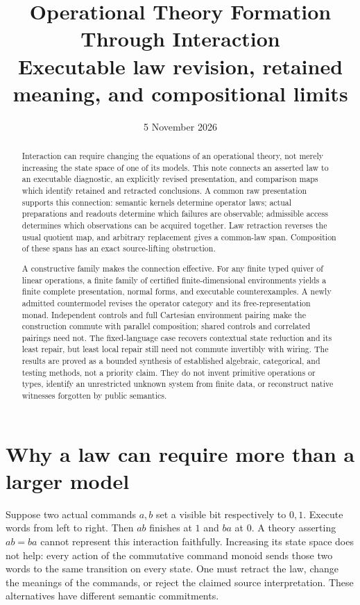 \documentclass[11pt]{article}
\title{Operational Theory Formation Through Interaction\\
\large Executable law revision, retained meaning, and compositional limits}
\author{}\date{5 November 2026}
\theoremstyle{definition}
\theoremstyle{remark}\newtheorem{remark}[theorem]{Remark}
\begin{document}
\maketitle
\begin{abstract}
Interaction can require changing the equations of an operational theory,
not merely increasing the state space of one of its models. This note
connects an asserted law to an executable diagnostic, an explicitly
revised presentation, and comparison maps which identify retained and
retracted conclusions. A common raw presentation supports this connection:
semantic kernels determine operator laws; actual preparations and readouts
determine which failures are observable; admissible access determines which
observations can be acquired together. Law retraction reverses the usual
quotient map, and arbitrary replacement gives a common-law span.
Composition of these spans has an exact source-lifting obstruction.

A constructive family makes the connection effective. For any finite typed
quiver of linear operations, a finite family of certified finite-dimensional
environments yields a finite complete presentation, normal forms, and
executable counterexamples. A newly admitted countermodel revises the
operator category and its free-representation monad. Independent controls
and full Cartesian environment pairing make the construction commute with
parallel composition; shared controls and correlated pairings need not.
The fixed-language case recovers contextual state reduction and its least
repair, but least local repair still need not commute invertibly with
wiring. The results are proved as a bounded synthesis of established
algebraic, categorical, and testing methods, not a priority claim.
They do not invent primitive operations or types, identify an unrestricted
unknown system from finite data, or reconstruct native witnesses forgotten
by public semantics.
\end{abstract}
\tableofcontents

\section{Why a law can require more than a larger model}
Suppose two actual commands $a,b$ set a visible bit respectively to $0,1$.
Execute words from left to right. Then $ab$ finishes at $1$ and $ba$ at
$0$. A theory asserting $ab=ba$ cannot represent this interaction faithfully.
Increasing its state space does not help: every action of the commutative
command monoid sends those two words to the same transition on every state.
One must retract the law, change the meanings of the commands, or reject
the claimed source interpretation. These alternatives have different
semantic commitments.
\end{document}
